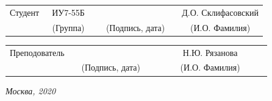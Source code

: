 \documentclass[14pt, a4paper]{extarticle}
\begin{document}
\noindent
{}
\\

\noindent
{}
\\

\vspace{1.5cm}
\noindent
\begin{tabular}{l c c c c c}
	Студент      & ~ИУ7-55Б~               & \hspace{2.5cm} & \hspace{2cm}                 & &  Д.О. Склифасовский \\\cline{2-2}\cline{4-4} \cline{6-6} 
	\hspace{3cm} & {\footnotesize(Группа)} &                & {\footnotesize(Подпись, дата)} & & {\footnotesize(И.О. Фамилия)}
\end{tabular}

\noindent
\begin{tabular}{l c c c c}
	Преподователь & \hspace{5cm}   & \hspace{2cm}                 & & ~~~~~~Н.Ю. Рязанова~~~~~~\\\cline{3-3} \cline{5-5} 
	\hspace{3cm}  &                & {\footnotesize(Подпись, дата)} & & {\footnotesize(И.О. Фамилия)}
\end{tabular}

\vspace{0.6cm}
\begin{center}	
	\vfill
	\large \textit {Москва, 2020}
\end{center}

\thispagestyle {empty}
\pagebreak

\clearpage
\tableofcontents

\clearpage
\end{document}
